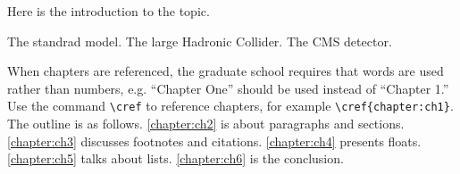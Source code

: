 Here is the introduction to the topic.


The standrad model.
The large Hadronic Collider.
The CMS detector. 




When chapters are referenced, the graduate school requires that words are used rather than numbers, e.g. ``Chapter One'' should be used instead of ``Chapter 1.''
Use the command \verb|\cref| to reference chapters, for example \verb|\cref{chapter:ch1}|.
The outline is as follows.
\cref{chapter:ch2} is about paragraphs and sections.
\cref{chapter:ch3} discusses footnotes and citations.
\cref{chapter:ch4} presents floats.
\cref{chapter:ch5} talks about lists.
\cref{chapter:ch6} is the conclusion.

